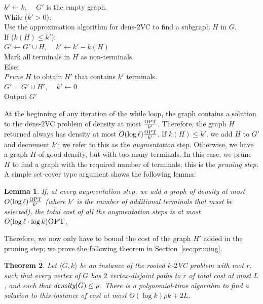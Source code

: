 \documentclass[11pt]{article}
\newtheorem{lemma}{Lemma}[section]
\newtheorem{theorem}[lemma]{Theorem}
\newcommand{\assign}{\leftarrow}
\newcommand{\kvc}[1]{$k$-$#1${\sc VC} }
\newcommand{\kv}{\kvc{2}}
\newcommand{\densV}{dens-$2${\sc VC} }
\newcommand{\opt}{\textrm{\sc OPT}}
\newcommand{\dens}[1]{\emph{density}(#1)}
\begin{document}
\begin{algo}
  $k' \assign k$, $\quad G'$ is the empty graph. \\
  While ($k' > 0$): \+ \\
  Use the approximation algorithm for \densV to find a subgraph $H$ in $G$.\\
  If ($k(H) \le k'$): \+ \\
  $G' \assign G' \cup H$, $\quad k' \assign k' - k(H)$ \\
  Mark all terminals in $H$ as non-terminals. \- \\
  Else: \+ \\
  {\em Prune} $H$ to obtain $H'$ that contains $k'$ terminals. \\
  $G' = G' \cup H'$, $\quad k' \assign 0$ \- \- \\
  Output $G'$
\end{algo}

At the beginning of any iteration of the while loop, the graph contains a
solution to the \densV problem of density at most $\frac{\opt}{k'}$.
Therefore, the graph $H$ returned always has density at most $O(\log \ell)
\frac{\opt}{k'}$. If $k(H) \le k'$, we add $H$ to $G'$ and decrement $k'$;
we refer to this as the \emph{augmentation} step. Otherwise, we have a
graph $H$ of good density, but with too many terminals. In this case, we
prune $H$ to find a graph with the required number of terminals; this is
the \emph{pruning step}. A simple set-cover type argument shows the
following lemma:

\begin{lemma}\label{lem:greedy}
  If, at every augmentation step, we add a graph of density at most
  $O(\log \ell) \frac{\opt}{k'}$ (where $k'$ is the number of
  additional terminals that must be selected), the total cost of all
  the augmentation steps is at most $O(\log \ell \cdot \log k) \opt$.
\end{lemma}

Therefore, we now only have to bound the cost of the graph $H'$ added
in the pruning step; we prove the following theorem in
Section~\ref{sec:pruning}.

\begin{theorem} \label{thm:avekv} Let $\langle G,k \rangle$ be an
  instance of the rooted \kv problem with root $r$, such that every
  vertex of $G$ has $2$ vertex-disjoint paths to $r$ of total cost at
  most $L$, and such that $\dens{G} \le \rho$. There is a
  polynomial-time algorithm to find a solution to this instance of
  cost at most $O(\log k)\rho k + 2L$.
\end{theorem}
\end{document}
